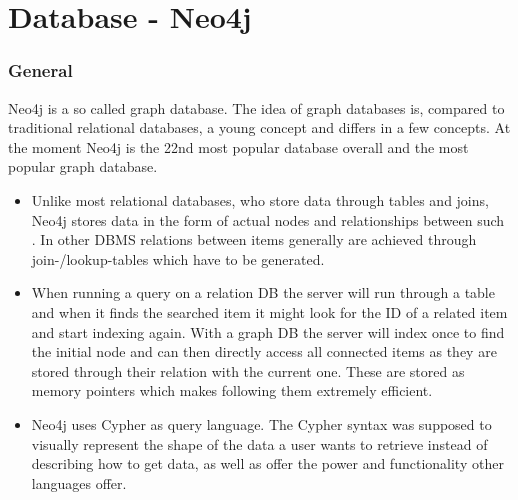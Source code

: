 \section{Database - Neo4j}
\subsubsection{General}
Neo4j is a so called graph database. The idea of graph databases is, compared to traditional relational databases, a young concept and differs in a few concepts. At the moment Neo4j is the 22nd most popular database overall \cite{DbEnginesGeneral} and the most popular graph database. \cite{DbEnginesGraph}

\begin{itemize}
\item Unlike most relational databases, who store data through tables and joins, Neo4j stores data in the form of actual nodes and relationships between such \cite{Neo4jDevGuides}. In other DBMS relations between items generally are achieved through join-/lookup-tables which have to be generated. \cite{RelVsGraph}

\item When running a query on a relation DB the server will run through a table and when it finds the searched item it might look for the ID of a related item and start indexing again. With a graph DB the server will index \citep[minute 32]{NeoInternals} once to find the initial node and can then directly access all connected items as they are stored through their relation with the current one. \cite{WhatGraphDB} These are stored as memory pointers which makes following them extremely efficient.
\item Neo4j uses Cypher as query language. The Cypher syntax was supposed to visually represent the shape of the data a user wants to retrieve instead of describing how to get data, as well as offer the power and functionality other languages offer. \cite{Neo4jCypher} 
\end{itemize}

